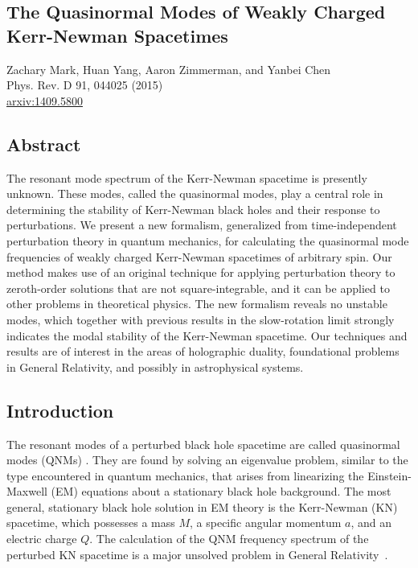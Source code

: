 \begin{refsection}
\newcommand{\LL}{\mathcal{L}}
\newcommand{\DD}{\mathcal{D}}
\def\p{\bar{\rho}}


\chapter{The Quasinormal Modes of Weakly Charged Kerr-Newman Spacetimes}
\label{chap:KN_QNM}

\begin{centering}
Zachary Mark, Huan Yang, Aaron Zimmerman, and Yanbei Chen \\
Phys. Rev. D 91, 044025 (2015) \\
\href{https://https://arxiv.org/abs/1409.5800}{arxiv:1409.5800} \\
\end{centering}

\section{Abstract}
The resonant mode spectrum of the Kerr-Newman spacetime is presently unknown.
These modes, called the quasinormal modes, play a central role in determining the stability of Kerr-Newman black holes and their response to perturbations.
We present a new formalism, generalized from time-independent perturbation theory in quantum mechanics, for calculating the quasinormal mode frequencies of weakly charged Kerr-Newman spacetimes of arbitrary spin. 
Our method makes use of an original technique for applying perturbation theory to zeroth-order solutions that are not square-integrable, and it can be applied to other problems in theoretical physics. 
The new formalism reveals no unstable modes, which together with previous results in the slow-rotation limit strongly indicates the modal stability of the Kerr-Newman spacetime. 
Our techniques and results are of interest in the areas of holographic duality, foundational problems in General Relativity, and possibly in astrophysical systems.


\section{Introduction}
 
The resonant modes of a perturbed black hole spacetime are called quasinormal modes (QNMs) \cite{Berti2009}. They are found by solving an eigenvalue problem, similar to the type encountered in quantum mechanics, that arises from linearizing the Einstein-Maxwell (EM) equations about a stationary black hole background. The most general, stationary black hole solution in EM theory is the Kerr-Newman (KN) spacetime, which possesses a mass $M$, a specific angular momentum $a$, and an electric charge $Q$. The calculation of the QNM frequency spectrum of the perturbed KN spacetime is a major unsolved problem in General Relativity~\cite{ChandraBook}.


\end{refsection}
